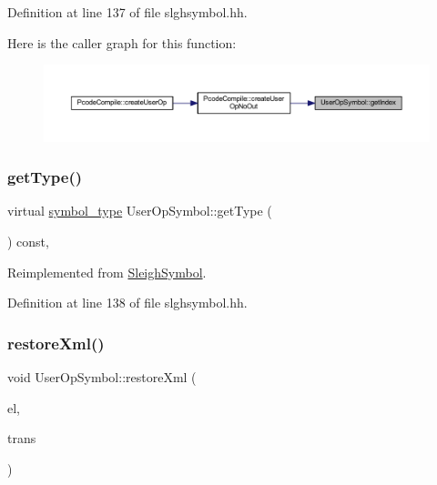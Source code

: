 Definition at line 137 of file slghsymbol.\+hh.

Here is the caller graph for this function\+:
\nopagebreak
\begin{figure}[H]
\begin{center}
\leavevmode
\includegraphics[width=350pt]{class_user_op_symbol_ab62b03a3cb7d7dce34edc8f598b90700_icgraph}
\end{center}
\end{figure}
\mbox{\label{class_user_op_symbol_a1a7a884e2e3317f5c756dfc848d1e1c0}} 
\subsubsection{\texorpdfstring{getType()}{getType()}}
{\footnotesize\ttfamily virtual \mbox{\hyperlink{class_sleigh_symbol_aba70f7f332fd63488c5ec4bd7807db41}{symbol\+\_\+type}} User\+Op\+Symbol\+::get\+Type (\begin{DoxyParamCaption}\item[{void}]{ }\end{DoxyParamCaption}) const\hspace{0.3cm}{\ttfamily [inline]}, {\ttfamily [virtual]}}



Reimplemented from \mbox{\hyperlink{class_sleigh_symbol_a2f6e5903e461084c29f95ea024883950}{Sleigh\+Symbol}}.



Definition at line 138 of file slghsymbol.\+hh.

\mbox{\label{class_user_op_symbol_a96b0bf7c65b30f21307b156bf13bc1a7}} 
\subsubsection{\texorpdfstring{restoreXml()}{restoreXml()}}
{\footnotesize\ttfamily void User\+Op\+Symbol\+::restore\+Xml (\begin{DoxyParamCaption}\item[{const \mbox{\hyperlink{class_element}{Element}} $\ast$}]{el,  }\item[{\mbox{\hyperlink{class_sleigh_base}{Sleigh\+Base}} $\ast$}]{trans }\end{DoxyParamCaption})\hspace{0.3cm}{\ttfamily [virtual]}}




